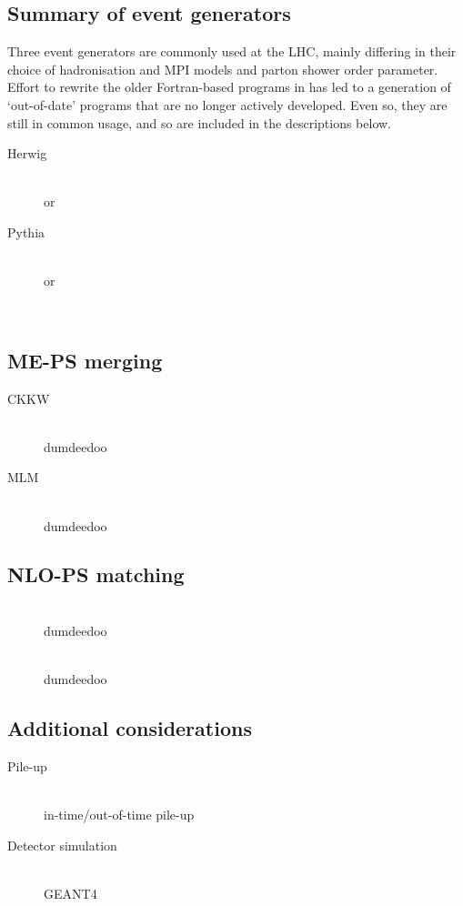 \subsection{Summary of event generators}
\label{sec:mc:generators}

Three event generators are commonly used at the \acs{LHC}, mainly differing in their 
choice of hadronisation and \ac{MPI} models and parton shower order parameter. Effort to 
rewrite the older Fortran-based programs in \cpp has led to a generation of `out-of-date' 
programs that are no longer actively developed. Even so, they are still in common usage, 
and so are included in the descriptions below.

\begin{description}
\item[Herwig] \hfill \\
	\fherwig or \herwigpp 
\item[Pythia] \hfill \\
	 or 
\item[\sherpa] \hfill \\
	\sherpa
\end{description}

\subsection{ME-PS merging}
\label{sec:mc:merging}

\begin{description}
\item[CKKW] \hfill \\
	dumdeedoo
\item[MLM] \hfill \\
	dumdeedoo
\end{description}

\subsection{NLO-PS matching}
\label{sec:mc:matching}

\begin{description}
\item[\mcatnlo] \hfill \\
	dumdeedoo
\item[\powheg] \hfill \\
	dumdeedoo
\end{description}

\subsection{Additional considerations}
\begin{description}
\item[Pile-up] \hfill \\
	in-time/out-of-time pile-up
\item[Detector simulation] \hfill \\
	GEANT4
\end{description}